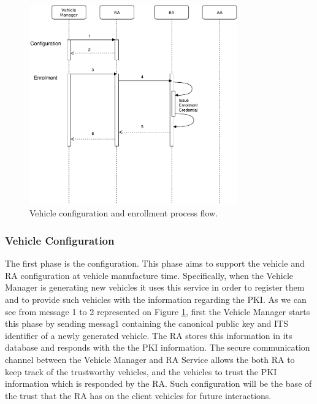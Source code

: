 \begin{figure}[t]
	\centering
	\includegraphics[width=0.8\textwidth]{Figures/protocolo_1}
	\caption{\label{fig:protocol_1}Vehicle configuration and enrollment process flow.}
\end{figure}

\subsubsection{Vehicle Configuration} \label{conf}
The first phase is the configuration. This phase aims to support the vehicle and RA configuration at vehicle manufacture time. Specifically, when the Vehicle Manager is generating new vehicles it uses this service in order to register them and to provide such vehicles with the information regarding the PKI. As we can see from message 1 to 2 represented on Figure \ref{fig:protocol_1}, first the Vehicle Manager starts this phase by sending messag1 containing the canonical public key and ITS identifier of a newly generated vehicle. The RA stores this information in its database and responds with the the PKI information. The secure communication channel between the Vehicle Manager and RA Service allows the both RA to keep track of the trustworthy vehicles, and the vehicles to trust the PKI information which is responded by the RA. Such configuration will be the base of the trust that the RA has on the client vehicles for future interactions. 

